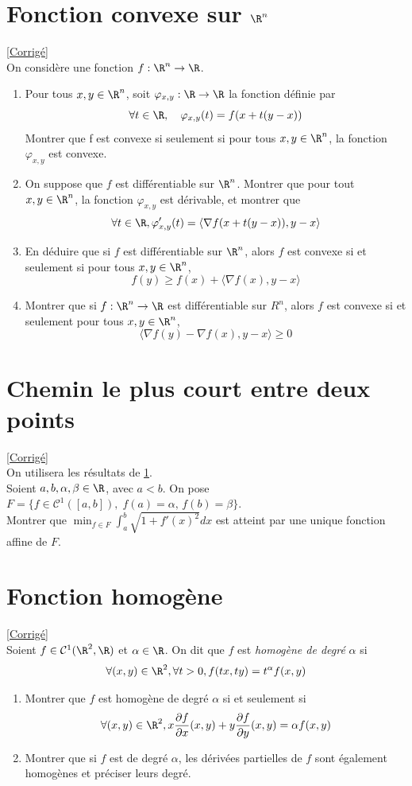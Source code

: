 \documentclass{book}
\begin{document}
\section{Fonction convexe sur $\R^n$}
\label{Fonction convexe sur R^n}
\textcolor{blue}{\hyperref[sec:fonction-convexe-sur-rn]{[Corrigé]}}\\
On considère une fonction $f:\R^n\to\R$.
\begin{enumerate}
	\item Pour tous $x,y\in\R^n$, soit $\varphi_{x,y}:\R\to\R$ la fonction définie par $$\forall t\in\R,\quad \varphi_{x,y}(t)=f(x+t(y-x))$$
	Montrer que f est convexe si seulement si pour tous $x,y\in\R^n$, la fonction $\varphi_{x,y}$ est convexe.
	\item On suppose que $f$ est différentiable sur $\R^n$. Montrer que pour tout $x,y\in\R^n$, la fonction $\varphi_{x,y}$ est dérivable, et montrer que $$\forall t\in\R, \varphi_{x,y}'(t)=\langle\nabla f(x+t(y-x)),y-x\rangle$$
	\item En déduire que si $f$ est différentiable sur $\R^n$, alors $f$ est convexe si et seulement si pour tous $x,y\in\R^n$, $$f(y)\geq f(x)+\langle \nabla f(x),y-x\rangle$$
	\item Montrer que si $f:\R^n\to\R$ est différentiable sur $R^n$, alors $f$ est convexe si et seulement pour tous $x,y\in\R^n$, $$\langle\nabla f(y)-\nabla f(x),y-x\rangle\geq 0$$
\end{enumerate}

\section{Chemin le plus court entre deux points}
\label{Chemin le plus court entre deux points}
\textcolor{blue}{\hyperref[sec:chemin-le-plus-court-entre-deux-points]{[Corrigé]}}\\
On utilisera les résultats de \ref{Fonction convexe sur R^n}.\\
Soient $a,b,\alpha,\beta \in\R$, avec $a<b$. On pose $F=\{f\in\mathcal{C}^1([a,b]), \; f(a)=\alpha, \, f(b)=\beta\}$.
\\ Montrer que $\displaystyle \min_{f\in F}\int_a^b \sqrt{1+f'(x)^2}dx$ est atteint par une unique fonction affine de $F$.


\section{Fonction homogène}
\label{Fonction homogène}
\textcolor{blue}{\hyperref[sec:fonction-homogene]{[Corrigé]}}\\
Soient $f\in\mathcal{C}^1(\R^2,\R)$ et $\alpha\in\R$. On dit que $f$ est \textit{homogène de degré} $\alpha$ si $$\forall (x,y)\in\R^2, \forall t>0, f(tx,ty)=t^{\alpha}f(x,y)$$
\begin{enumerate}
	\item Montrer que $f$ est homogène de degré $\alpha$ si et seulement si $$\forall (x,y)\in\R^2, x\frac{\partial f}{\partial x}(x,y)+y\frac{\partial f}{\partial y}(x,y)=\alpha f(x,y)$$
	\item Montrer que si $f$ est de degré $\alpha$, les dérivées partielles de $f$ sont également homogènes et préciser leurs degré.
\end{enumerate}
\end{document}
